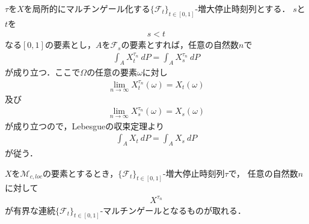 	\begin{sketch}
		$\tau$を$X$を局所的にマルチンゲール化する$\{\mathscr{F}_{t}\}_{t \in [0,1]}$-増大停止時刻列とする．
		$s$と$t$を
		\begin{align}
			s < t
		\end{align}
		なる$[0,1]$の要素とし，$A$を$\mathscr{F}_{s}$の要素とすれば，任意の自然数$n$で
		\begin{align}
			\int_{A} X^{\tau_{n}}_{t}\ dP = \int_{A} X^{\tau_{n}}_{s}\ dP
		\end{align}
		が成り立つ．ここで$\Omega$の任意の要素$\omega$に対し
		\begin{align}
			\lim_{n \to \infty} X^{\tau_{n}}_{t}(\omega) = X_{t}(\omega)
		\end{align}
		及び
		\begin{align}
			\lim_{n \to \infty} X^{\tau_{n}}_{s}(\omega) = X_{s}(\omega)
		\end{align}
		が成り立つので，Lebesgueの収束定理より
		\begin{align}
			\int_{A} X_{t}\ dP = \int_{A} X_{s}\ dP
		\end{align}
		が従う．
		\QED
	\end{sketch}
	
	\begin{screen}
		\begin{thm}
		\label{thm:increasing_stopping_times_which_locally_bound_martingale}
			$X$を$\mathscr{M}_{c,loc}$の要素とするとき，$\{\mathscr{F}_{t}\}_{t \in [0,1]}$-増大停止時刻列$\tau$で，
			任意の自然数$n$に対して
			\begin{align}
				X^{\tau_{n}}
			\end{align}
			が有界な連続$\{\mathscr{F}_{t}\}_{t \in [0,1]}$-マルチンゲールとなるものが取れる．
		\end{thm}
	\end{screen}
	
